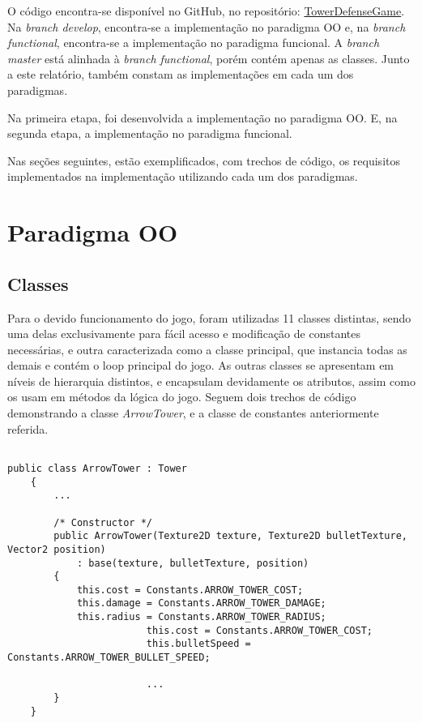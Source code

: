 \documentclass[rel_mlp]{iiufrgs}
\begin{document}
O código encontra-se disponível no GitHub, no repositório: \href{https://github.com/TMinuzzo/TowerDefenseGame/}{TowerDefenseGame}. Na \textit{branch develop}, encontra-se a implementação no paradigma OO e, na \textit{branch functional}, encontra-se a implementação no paradigma funcional. A \textit{branch master} está alinhada à \textit{branch functional}, porém contém apenas as classes. Junto a este relatório, também constam as implementações em cada um dos paradigmas.

Na primeira etapa, foi desenvolvida a implementação no paradigma OO. E, na segunda etapa, a implementação no paradigma funcional.

Nas seções seguintes, estão exemplificados, com trechos de código, os requisitos implementados na implementação utilizando cada um dos paradigmas. 

\section{Paradigma OO}

\subsection{Classes}

Para o devido funcionamento do jogo, foram utilizadas 11 classes distintas, sendo uma delas exclusivamente para fácil acesso e modificação de constantes necessárias, e outra caracterizada como a classe principal, que instancia todas as demais e contém o loop principal do jogo. As outras classes se apresentam em níveis de hierarquia distintos, e encapsulam devidamente os atributos, assim como os usam em métodos da lógica do jogo. Seguem dois trechos de código demonstrando a classe \textit{ArrowTower}, e a classe de constantes anteriormente referida.

\begin{lstlisting}[caption=Trecho de código C\# retirado da implementação deste trabalho, label=lst:test]

public class ArrowTower : Tower
	{
		...
		
		/* Constructor */
        public ArrowTower(Texture2D texture, Texture2D bulletTexture, Vector2 position)
            : base(texture, bulletTexture, position)
        {
            this.cost = Constants.ARROW_TOWER_COST;
            this.damage = Constants.ARROW_TOWER_DAMAGE;
            this.radius = Constants.ARROW_TOWER_RADIUS;
						this.cost = Constants.ARROW_TOWER_COST;
						this.bulletSpeed = Constants.ARROW_TOWER_BULLET_SPEED;
						
						...
        }
	}
\end{lstlisting}
\end{document}
